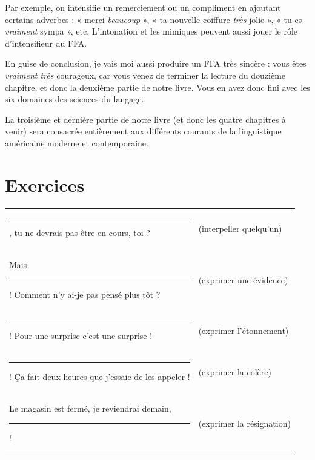 Par exemple, on intensifie un remerciement ou un compliment en ajoutant certains adverbes : « merci \textit{beaucoup} », « ta nouvelle coiffure \textit{très} jolie », « tu es \textit{vraiment} sympa », etc. L’intonation et les mimiques peuvent aussi jouer le rôle d’intensifieur du FFA.

En guise de conclusion, je vais moi aussi produire un FFA très sincère : vous êtes \textit{vraiment très} courageux, car vous venez de terminer la lecture du douzième chapitre, et donc la deuxième partie de notre livre. Vous en avez donc fini avec les six domaines des sciences du langage.

La troisième et dernière partie de notre livre (et donc les quatre chapitres à venir) sera consacrée entièrement aux différents courants de la linguistique américaine moderne et contemporaine.

\section*{Exercices}
\begin{keybox}
\small
\renewcommand{\arraystretch}{1.35}
\begin{tabularx}{\linewidth}{@{}>{\raggedright\arraybackslash}X>{\raggedright\arraybackslash}p{.30\linewidth}@{}}
\rule{20mm}{.35pt}, tu ne devrais pas être en cours, toi ? & (interpeller quelqu’un)\\
Mais \rule{20mm}{.35pt} ! Comment n’y ai-je pas pensé plus tôt ? & (exprimer une évidence)\\
\rule{20mm}{.35pt} ! Pour une surprise c’est une surprise ! & (exprimer l’étonnement)\\
\rule{20mm}{.35pt} ! Ça fait deux heures que j’essaie de les appeler ! & (exprimer la colère)\\
Le magasin est fermé, je reviendrai demain, \rule{20mm}{.35pt} ! & (exprimer la résignation)
\end{tabularx}
\end{keybox}

